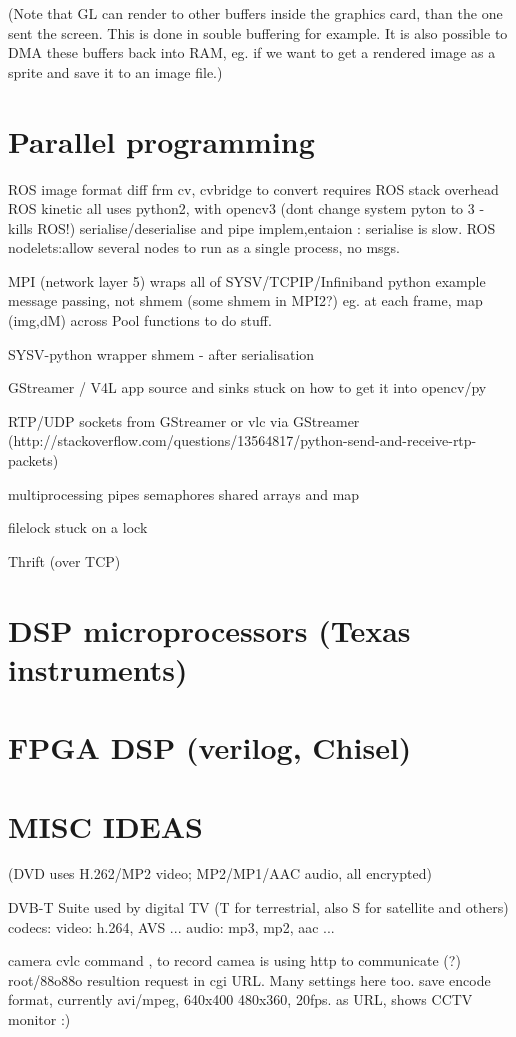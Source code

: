 \documentclass[oneside,english]{scrbook}
\begin{document}
(Note that GL can render to other buffers inside the graphics card, than the one sent the screen. This is done in souble buffering for example. It is also possible to DMA these buffers back into RAM, eg. if we want to get a rendered image as a sprite and save it to an image file.)

\chapter{Parallel programming}

ROS image format diff frm cv, cvbridge to convert requires ROS stack
overhead ROS kinetic all uses python2, with opencv3 (dont change system
pyton to 3 - kills ROS!) serialise/deserialise and pipe implem,entaion
: serialise is slow. ROS nodelets:allow several nodes to run as a
single process, no msgs.

MPI (network layer 5) wraps all of SYSV/TCPIP/Infiniband python example
message passing, not shmem (some shmem in MPI2?) eg. at each frame,
map (img,dM) across Pool functions to do stuff.

SYSV-python wrapper shmem - after serialisation

GStreamer / V4L app source and sinks stuck on how to get it into opencv/py

RTP/UDP sockets from GStreamer or vlc via GStreamer (http://stackoverflow.com/questions/13564817/python-send-and-receive-rtp-packets)

multiprocessing pipes semaphores shared arrays and map

filelock stuck on a lock

Thrift (over TCP)


\chapter{DSP microprocessors (Texas instruments)}

\chapter{FPGA DSP (verilog, Chisel)}

\chapter{MISC IDEAS}



(DVD uses H.262/MP2 video;  MP2/MP1/AAC audio, all encrypted)

DVB-T Suite used by digital TV (T for terrestrial, also S for satellite and others)
	codecs:
		video: h.264, AVS ...
		audio: mp3, mp2, aac ...


camera cvlc command , to record
	camea is using http to communicate (?) root/88o88o
	resultion request in cgi URL.  Many settings here too.
	save encode format, currently avi/mpeg, 640x400
	480x360, 20fps.
	as URL, shows CCTV monitor :)
\end{document}
